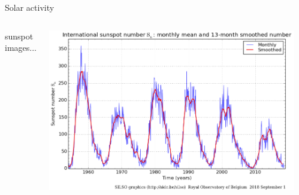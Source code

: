\begin{frame}[c]{Solar activity}{}
	\begin{columns}[c]
		
		sunspot images...
		
		
		\includegraphics[width=\textwidth]{../figures_of_others/images/ROB_SILSO_SSN_wolfmms_cropped.png}

		\vfill\hfill \hyperlink{butterfly}{}
		
	\end{columns}
\end{frame}
